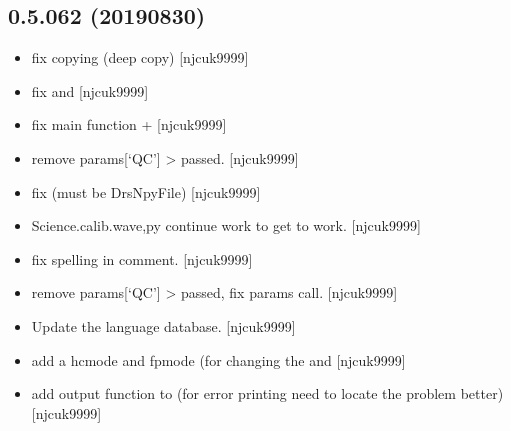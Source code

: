 \documentclass[a4paper,10pt,english]{report}
\begin{document}
\subsection{0.5.062 (2019\sphinxhyphen{}08\sphinxhyphen{}30)}
\label{\detokenize{misc/changelog:id99}}\begin{itemize}
\item {} 
 \sphinxhyphen{} fix copying (deep copy)
{[}njcuk9999{]}

\item {} 
 \sphinxhyphen{} fix  and  {[}njcuk9999{]}

\item {} 
 \sphinxhyphen{} fix main function  +  {[}njcuk9999{]}

\item {} 
 \sphinxhyphen{} remove params{[}‘QC’{]} \textendash{}\textgreater{} passed. {[}njcuk9999{]}

\item {} 
 \sphinxhyphen{} fix  (must be DrsNpyFile)
{[}njcuk9999{]}

\item {} 
Science.calib.wave,py \sphinxhyphen{} continue work to get  to
work. {[}njcuk9999{]}

\item {} 
 \sphinxhyphen{} fix spelling in comment. {[}njcuk9999{]}

\item {} 
 \sphinxhyphen{} remove params{[}‘QC’{]} \textendash{}\textgreater{} passed, fix 
params call. {[}njcuk9999{]}

\item {} 
Update the language database. {[}njcuk9999{]}

\item {} 
 \sphinxhyphen{} add a hcmode and
fpmode (for changing the  and  {[}njcuk9999{]}

\item {} 
 \sphinxhyphen{} add output function to  (for error
printing \sphinxhyphen{} need to locate the problem better) {[}njcuk9999{]}


\end{itemize}
\end{document}
